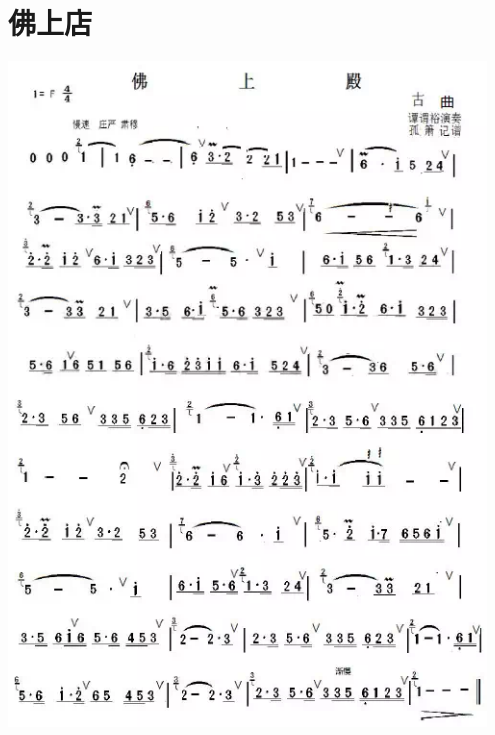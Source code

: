\documentclass[cn,pad,twocol]{elegantbook}
\begin{document}
\section{佛上店}\includegraphics[width=0.95\textwidth]{dongxiao/20200819/佛上店.png}
\end{document}
